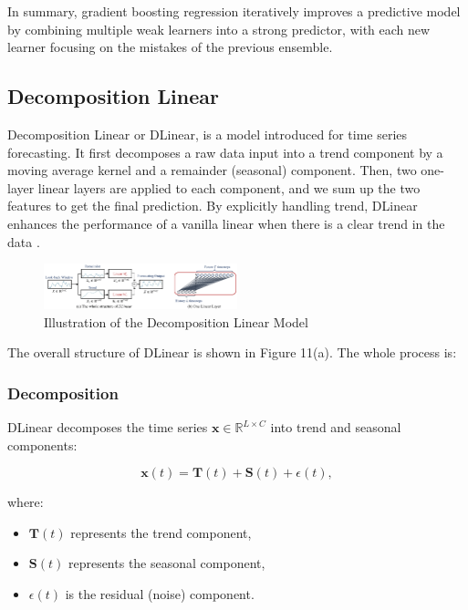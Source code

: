 \documentclass{ieeeojies}
\begin{document}
In summary, gradient boosting regression iteratively improves a predictive model by combining multiple weak learners into a strong predictor, with each new learner focusing on the mistakes of the previous ensemble.
\subsection{Decomposition Linear}
Decomposition Linear or DLinear, is a model introduced for time series forecasting.  It first decomposes a raw data input into a trend component by a moving average kernel and a remainder (seasonal) component. Then, two
one-layer linear layers are applied to each component,
and we sum up the two features to get the final prediction. By explicitly handling trend, DLinear enhances
the performance of a vanilla linear when there is a clear
trend in the data \cite{b15}.

\begin{figure} [H]
    \centering
    \includegraphics[width=0.5\textwidth]{bibliography/Figure/Illu_DLinear.png}
    \caption{Illustration of the Decomposition Linear Model}
    \label{fig:DLinear Illustration}
\end{figure}

The overall structure of DLinear is shown in Figure 11(a). The whole process is:

\subsubsection{Decomposition}
DLinear decomposes the time series $\mathbf{x} \in \mathbb{R}^{L \times C}$ into trend and seasonal components:

\begin{equation}
    \mathbf{x}(t) = \mathbf{T}(t) + \mathbf{S}(t) + \epsilon(t),
\end{equation}

where:
\begin{itemize}
    \item $\mathbf{T}(t)$ represents the trend component,
    \item $\mathbf{S}(t)$ represents the seasonal component,
    \item $\epsilon(t)$ is the residual (noise) component.
\end{itemize}
\end{document}
